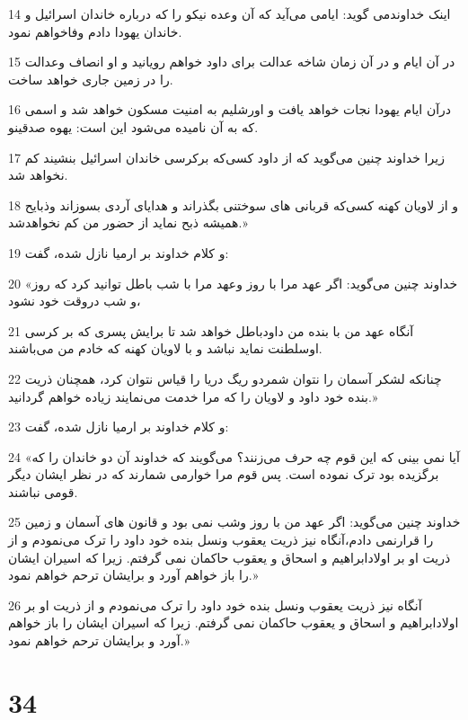 \par 14 اینک خداوندمی گوید: ایامی می‌آید که آن وعده نیکو را که درباره خاندان اسرائیل و خاندان یهودا دادم وفاخواهم نمود.
\par 15 در آن ایام و در آن زمان شاخه عدالت برای داود خواهم رویانید و او انصاف وعدالت را در زمین جاری خواهد ساخت.
\par 16 درآن ایام یهودا نجات خواهد یافت و اورشلیم به امنیت مسکون خواهد شد و اسمی که به آن نامیده می‌شود این است: یهوه صدقینو.
\par 17 زیرا خداوند چنین می‌گوید که از داود کسی‌که برکرسی خاندان اسرائیل بنشیند کم نخواهد شد. 
\par 18 و از لاویان کهنه کسی‌که قربانی های سوختنی بگذراند و هدایای آردی بسوزاند وذبایح همیشه ذبح نماید از حضور من کم نخواهدشد.»
\par 19 و کلام خداوند بر ارمیا نازل شده، گفت:
\par 20 «خداوند چنین می‌گوید: اگر عهد مرا با روز وعهد مرا با شب باطل توانید کرد که روز و شب دروقت خود نشود،
\par 21 آنگاه عهد من با بنده من داودباطل خواهد شد تا برایش پسری که بر کرسی اوسلطنت نماید نباشد و با لاویان کهنه که خادم من می‌باشند.
\par 22 چنانکه لشکر آسمان را نتوان شمردو ریگ دریا را قیاس نتوان کرد، همچنان ذریت بنده خود داود و لاویان را که مرا خدمت می‌نمایند زیاده خواهم گردانید.»
\par 23 و کلام خداوند بر ارمیا نازل شده، گفت:
\par 24 «آیا نمی بینی که این قوم چه حرف می‌زنند؟ می‌گویند که خداوند آن دو خاندان را که برگزیده بود ترک نموده است. پس قوم مرا خوارمی شمارند که در نظر ایشان دیگر قومی نباشند.
\par 25 خداوند چنین می‌گوید: اگر عهد من با روز وشب نمی بود و قانون های آسمان و زمین را قرارنمی دادم،آنگاه نیز ذریت یعقوب ونسل بنده خود داود را ترک می‌نمودم و از ذریت او بر اولادابراهیم و اسحاق و یعقوب حاکمان نمی گرفتم. زیرا که اسیران ایشان را باز خواهم آورد و برایشان ترحم خواهم نمود.»
\par 26 آنگاه نیز ذریت یعقوب ونسل بنده خود داود را ترک می‌نمودم و از ذریت او بر اولادابراهیم و اسحاق و یعقوب حاکمان نمی گرفتم. زیرا که اسیران ایشان را باز خواهم آورد و برایشان ترحم خواهم نمود.»
 
\chapter{34}

